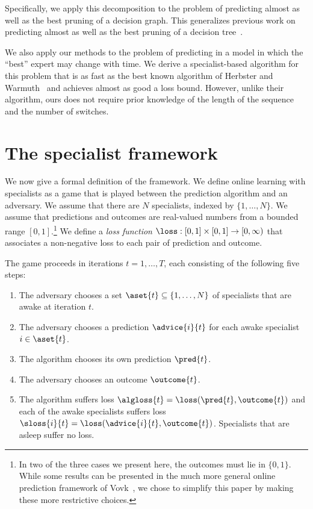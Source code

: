 Specifically, we apply this decomposition to the problem of predicting
almost as well as the best pruning of a decision graph.
This generalizes previous work on predicting almost as well as the
best pruning of a decision tree~\cite{WillemsShTj95,HelmboldSc95}.

We also apply our methods to the problem of predicting in a model in
which the ``best'' expert may change with time.
We derive a specialist-based algorithm for this problem that
is as fast as the best known algorithm of Herbster and
Warmuth~\cite{HerbsterWa95} and 
achieves almost as good a loss bound.
However, unlike their algorithm, ours does not require prior
knowledge of the length of the sequence and the number of switches.

\section{The specialist framework}

We now give a formal definition of the framework.
We define online learning with specialists as a game
that is played between the prediction algorithm and an adversary.
We assume that there are $N$ specialists, indexed by
$\{1,\ldots,N\}$. We assume that predictions and outcomes are
real-valued numbers from a bounded range $[0,1]$.\footnote{In 
two of the three cases we present here,
the outcomes must lie in $\{0,1\}$.
While some results can be presented in the much more
general online prediction framework of Vovk~\cite{Vovk95}, we chose to
simplify this paper by making these more restrictive choices.}
We define a {\em loss function} $\loss: [0,1] \times [0,1]
\to [0,\infty)$ that associates a non-negative loss to
each pair of prediction and outcome.

The game proceeds in iterations $t=1,\ldots,T$, each
consisting of the following five steps:
\begin{enumerate}
\item
The adversary chooses a set $\aset{t} \subseteq \{1,\ldots,N\}$ of
specialists that are awake at iteration $t$.
\item
The adversary chooses a prediction $\advice{i}{t}$ for each awake
specialist $i \in \aset{t}$. 
\item
The algorithm chooses its own prediction $\pred{t}$.
\item
The adversary chooses an outcome $\outcome{t}$.
\item
The algorithm suffers loss $\algloss{t} = \loss(\pred{t},\outcome{t})$
and each of the awake specialists suffers loss $\sloss{i}{t}=
\loss(\advice{i}{t},\outcome{t})$. Specialists that are asleep suffer
no loss.
\end{enumerate}


